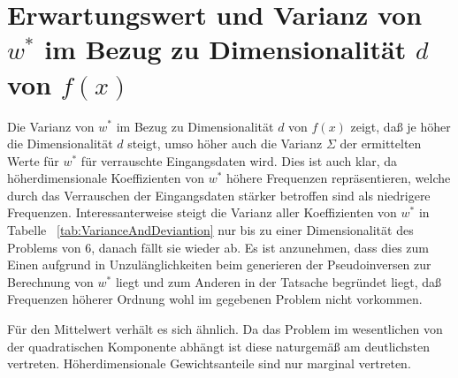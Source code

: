 \documentclass[]{report}
\begin{document}
\section{Erwartungswert und Varianz von $w^*$ im Bezug zu Dimensionalit\"at $d$ von $f(x)$}

Die Varianz von $w^*$ im Bezug zu Dimensionalit\"at $d$ von $f(x)$ zeigt, da{\ss} je h\"oher die Dimensionalit\"at $d$ steigt, umso h\"oher auch die Varianz $\Sigma$ der ermittelten Werte f\"ur $w^*$ f\"ur verrauschte Eingangsdaten wird. Dies ist auch klar, da h\"oherdimensionale Koeffizienten von $w^*$ h\"ohere Frequenzen repr\"asentieren, welche durch das Verrauschen der Eingangsdaten st\"arker betroffen sind als niedrigere Frequenzen.
Interessanterweise steigt die Varianz aller Koeffizienten von $w^*$ in Tabelle ~\ref{tab:VarianceAndDeviantion} nur bis zu einer Dimensionalit\"at des Problems von $6$, danach f\"allt sie wieder ab. Es ist anzunehmen, dass dies zum Einen aufgrund in Unzul\"anglichkeiten beim generieren der Pseudoinversen zur Berechnung von $w^*$ liegt und zum Anderen in der Tatsache begr\"undet liegt, da{\ss} Frequenzen h\"oherer Ordnung wohl im gegebenen Problem nicht vorkommen.

F\"ur den Mittelwert verh\"alt es sich \"ahnlich. Da das Problem im wesentlichen von der quadratischen Komponente abh\"angt ist diese naturgem\"a{\ss} am deutlichsten vertreten.
H\"oherdimensionale Gewichtsanteile sind nur marginal vertreten.
\end{document}
